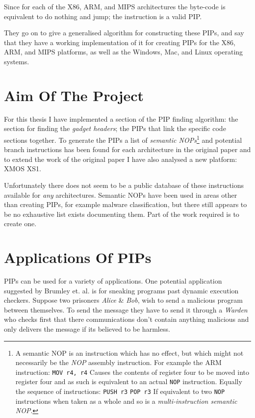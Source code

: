 \documentclass[10pt,]{book}
\begin{document}
Since for each of the X86, ARM, and MIPS architectures the byte-code is
equivalent to do nothing and jump; the instruction is a valid PIP.

They go on to give a generalised algorithm for constructing these PIPs,
and say that they have a working implementation of it for creating PIPs
for the X86, ARM, and MIPS platforms, as well as the Windows, Mac, and
Linux operating systems.

\section{Aim Of The Project}

For this thesis I have implemented a section of the PIP finding
algorithm: the section for finding the \emph{gadget headers}; the PIPs
that link the specific code sections together. To generate the PIPs a
list of \emph{semantic NOPs}\footnote{A semantic NOP is an instruction
  which has no effect, but which might not necessarily be the \emph{NOP}
  assembly instruction. For example the ARM instruction:
  \lstinline!MOV r4, r4! Causes the contents of register four to be
  moved into register four and as such is equivalent to an actual
  \lstinline!NOP! instruction. Equally the sequence of instructions:
  \lstinline!PUSH r3! \lstinline!POP r3! If equivalent to two
  \lstinline!NOP! instructions when taken as a whole and so is a
  \emph{multi-instruction semantic NOP}.} and potential branch
instructions has been found for each architecture in the original paper
and to extend the work of the original paper I have also analysed a new
platform: XMOS XS1.

Unfortunately there does not seem to be a public database of these
instructions available for \emph{any} architectures. Semantic NOPs have
been used in areas other than creating PIPs, for example malware
classification\autocite{Bilar:2007uu}\autocite{Preda:2007ky}, but there
still appears to be no exhaustive list exists documenting them. Part of
the work required is to create one.

\section{Applications Of PIPs}

PIPs can be used for a variety of applications. One potential
application suggested by Brumley et. al.\autocite{Cha:2010uh} is for
sneaking programs past dynamic execution checkers. Suppose two prisoners
\emph{Alice} \& \emph{Bob}, wish to send a malicious program between
themselves. To send the message they have to send it through a
\emph{Warden} who checks first that there communications don't contain
anything malicious and only delivers the message if its believed to be
harmless.
\end{document}
